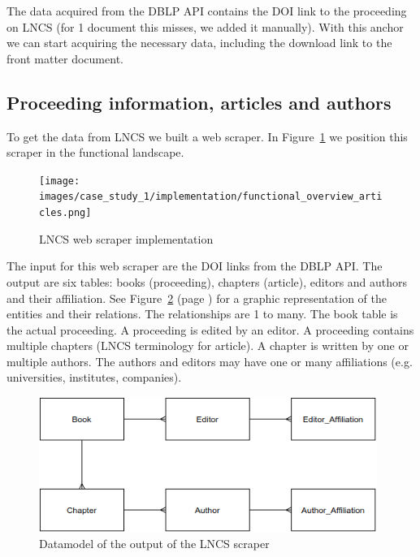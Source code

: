\documentclass{ou-report}
\newcommand{\doi}{{DOI}}
\newcommand{\lncs}{LNCS}
\newcommand{\dblp}{DBLP}
\newcommand{\api}{API}
\begin{document}
The data acquired from the \dblp{} \api{} contains the \doi{} link to 
the proceeding on \lncs{} (for 1 document this misses, we added it manually). 
With this anchor we can start acquiring the necessary data, including the 
download link to the front matter document.

\subsection{Proceeding information, articles and authors}
\label{subsec:springer_website}
To get the data from \lncs{} we built a web scraper. In 
Figure~\ref{fig:functional_overview_articles} we position this scraper in the 
functional landscape.

\begin{figure}[H]
    \centering
    \texttt{[image: images/case\_study\_1/implementation/functional\_overview\_articles.png]}
    \caption{LNCS web scraper implementation}
    \label{fig:functional_overview_articles}
\end{figure}

The input for this web scraper are the \doi{} links from the \dblp{} \api{}.
The output are six tables: books (proceeding), chapters (article), editors and 
authors and their affiliation. See Figure~\ref{fig:lncs_scraper_datamodel} (page 
\pageref{fig:lncs_scraper_datamodel}) for a graphic representation of the 
entities and their relations. The relationships are 1 to many.
The book table is the actual proceeding. A proceeding is edited by an editor. 
A proceeding contains multiple chapters (\lncs{} terminology for article). A
chapter is written by one or multiple authors. The authors and editors may 
have one or many affiliations (e.g. universities, institutes, companies).

\begin{figure}[ht]
    \centering
    \includegraphics[width=11cm]{images/lncs_scraper_datamodel.drawio.png}
    \caption{Datamodel of the output of the \lncs{} scraper}
    \label{fig:lncs_scraper_datamodel}
\end{figure}
\end{document}

